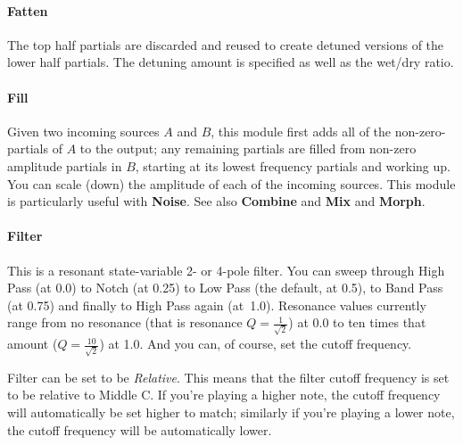 \documentclass{article}
\begin{document}
\paragraph{Fatten}  The top half partials are discarded and reused to create detuned versions of the lower half partials.  The detuning amount is specified as well as the wet/dry ratio.

\paragraph{Fill}  Given two incoming sources \(A\) and \(B\), this module first adds all of the non-zero-partials of \(A\) to the output; any remaining partials are filled from non-zero amplitude partials in \(B\), starting at its lowest frequency partials and working up.  You can scale (down) the amplitude of each of the incoming sources.  This module is particularly useful with {\bf Noise}.  See also {\bf Combine} and {\bf Mix} and {\bf Morph}.

\paragraph{Filter}  This is a resonant state-variable 2- or 4-pole filter. You can sweep through High Pass (at 0.0) to Notch (at 0.25) to Low Pass (the default, at 0.5), to Band Pass (at 0.75) and finally to High Pass again (at~1.0).  Resonance values currently range from no resonance (that is resonance \(Q=\frac{1}{\sqrt{2}}\)) at 0.0 to ten times that amount (\(Q =\frac{10}{\sqrt{2}}\))  at 1.0.  And you can, of course, set the cutoff frequency.

Filter can be set to be {\it Relative}.  This means that the filter cutoff frequency is set to be relative to Middle C.  If you're playing a higher note, the cutoff frequency will automatically be set higher to match; similarly if you're playing a lower note, the cutoff frequency will be automatically lower.

\end{document}
